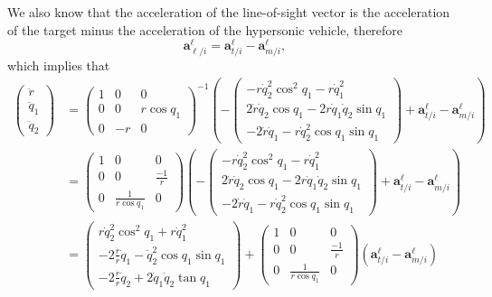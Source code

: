 \documentclass{article}
\newcommand{\abf}{\mathbf{a}}
\begin{document}
We also know that the acceleration of the line-of-sight vector is the acceleration of the target minus the acceleration of the hypersonic vehicle, therefore
\[
\abf_{\ell/i}^\ell = \abf_{t/i}^\ell - \abf_{m/i}^\ell,
\]
which implies that
\begin{align*}
	\begin{pmatrix} \ddot{r} \\ \ddot{q}_1 \\ \ddot{q}_2 \end{pmatrix} 
		&= \begin{pmatrix}
 	    1 & 0 & 0 \\
 	    0 & 0 & r\cos q_1 \\
 	    0 & -r & 0  
 	   \end{pmatrix}^{-1}\left(
 	   -\begin{pmatrix}
 	    - r\dot{q}_2^2\cos^2 q_1 -r\dot{q}_1^2 \\
 	     2\dot{r}\dot{q}_2  \cos q_1  - 2r\dot{q}_1\dot{q}_2\sin q_1 \\
 	    -2\dot{r} \dot{q}_1  - r\dot{q}_2^2\cos q_1 \sin q_1 
 	   \end{pmatrix} + \abf_{t/i}^\ell - \abf_{m/i}^\ell \right) \\
 	   &= \begin{pmatrix}
 	    1 & 0 & 0 \\
 	    0 & 0 & \frac{-1}{r} \\
 	    0 & \frac{1}{r\cos q_1} & 0  
 	   \end{pmatrix}\left(
 	   -\begin{pmatrix}
 	    - r\dot{q}_2^2\cos^2 q_1 -r\dot{q}_1^2 \\
 	     2\dot{r}\dot{q}_2  \cos q_1  - 2r\dot{q}_1\dot{q}_2\sin q_1 \\
 	    -2\dot{r} \dot{q}_1  - r\dot{q}_2^2\cos q_1 \sin q_1 
 	   \end{pmatrix} + \abf_{t/i}^\ell - \abf_{m/i}^\ell \right) \\
 	   &= \begin{pmatrix}
 	    	 r\dot{q}_2^2\cos^2 q_1 + r\dot{q}_1^2 \\
 	    	-2\frac{\dot{r}}{r} \dot{q}_1  - \dot{q}_2^2\cos q_1 \sin q_1 \\
 	     -2\frac{\dot{r}}{r} \dot{q}_2  + 2\dot{q}_1\dot{q}_2\tan q_1
 	   \end{pmatrix} 
 	   + \begin{pmatrix}
 	    1 & 0 & 0 \\
 	    0 & 0 & \frac{-1}{r} \\
 	    0 & \frac{1}{r\cos q_1} & 0  
 	   \end{pmatrix}\left(\abf_{t/i}^\ell - \abf_{m/i}^\ell \right) \\
\end{align*}
\end{document}
